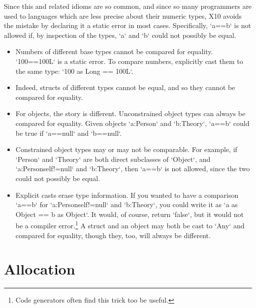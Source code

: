 Since this and related idioms are so common, and since so many programmers are
used to languages which are less precise about their numeric types, X10 avoids
the mistake by declaring it a static error in most cases.  Specifically,
\xcd`a==b` is not allowed if, by inspection of the types, \xcd`a` and \xcd`b`
could not possibly be equal.


\begin{itemize}

\item Numbers of different base types cannot be compared for equality.  
\xcd`100==100L` is a static error.  To compare numbers, explicitly cast them
to the same type: \xcd`100 as Long == 100L`.

\item Indeed, structs of different types cannot be equal, and so they cannot be
compared for equality.  

\item For objects, the story is different. Unconstrained object types can
      always be compared for equality. Given objects \xcd`a:Person` and
      \xcd`b:Theory`, \xcd`a==b` could be true if \xcd`a==null` and
      \xcd`b==null`. 

\item Constrained object types may or may not be comparable.  For example,  
      if \xcd`Person` and \xcd`Theory` are both direct subclasses of
      \xcd`Object`, and \xcd`a:Person{self!=null}` and \xcd`b:Theory`, then
      \xcd`a==b` is not allowed, since the two could not possibly be equal.

\item Explicit casts erase type information.  If you wanted
      to have a comparison \xcd`a==b` for \xcd`a:Person{self!=null}` and
      \xcd`b:Theory`, you could write it as \xcd`a as Object == b as Object`.
      It would, of course, return \xcd`false`, but it would not be a compiler
      error.\footnote{Code generators often find this trick too be useful.}
      A struct and an object may both be cast to \xcd`Any` and compared for
      equality, though they, too, will always be different.

\end{itemize}





\section{Allocation}
\label{ClassCreation}

